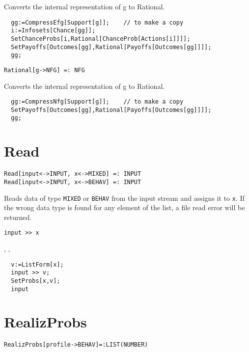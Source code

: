 \noindent
Converts the internal representation of g to Rational.  

\udfbody
\begin{verbatim}
  gg:=CompressEfg[Support[g]];    // to make a copy
  i:=Infosets[Chance[gg]];
  SetChanceProbs[i,Rational[ChanceProb[Actions[i]]]];
  SetPayoffs[Outcomes[gg],Rational[Payoffs[Outcomes[gg]]]];
  gg;
\end{verbatim} 

\newsignature

\begin{verbatim}
Rational[g->NFG] =: NFG 
\end{verbatim}

\noindent
Converts the internal representation of g to Rational.  

\udfbody
\begin{verbatim}
  gg:=CompressNfg[Support[g]];    // to make a copy
  SetPayoffs[Outcomes[gg],Rational[Payoffs[Outcomes[gg]]]];
  gg;
\end{verbatim} 


\section*{Read}\label{ExtRead}
\begin{verbatim}
Read[input<->INPUT, x<->MIXED] =: INPUT 
Read[input<->INPUT, x<->BEHAV] =: INPUT 
\end{verbatim}

\noindent
Reads data of type \verb+MIXED+ or \verb+BEHAV+ from the input
stream and assigns it to \verb+x+.  If the wrong data type is found
for any element of the list, a file read error will be returned.

\shortform \texttt{input >> x}

\seealso
{},
,

\udfbody
\begin{verbatim}
  v:=ListForm[x];
  input >> v;
  SetProbs[x,v];
  input
\end{verbatim} 


\section*{RealizProbs}\label{ExtRealizProbs}
\begin{verbatim}
RealizProbs[profile->BEHAV]=:LIST(NUMBER)
\end{verbatim}

